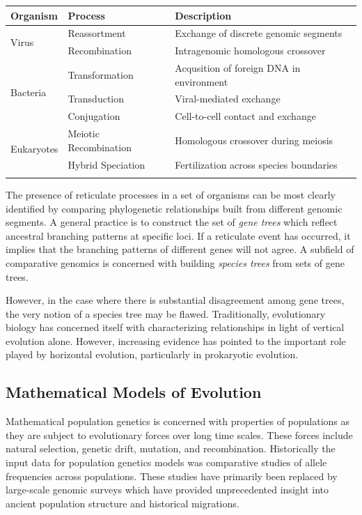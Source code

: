 \begin{tabularx}{\textwidth}{lll}
\toprule
Organism & Process & Description \\
\midrule
\multirow{2}{*}{Virus} & Reassortment & Exchange of discrete genomic segments \\
                       & Recombination & Intragenomic homologous crossover \\
\midrule
\multirow{3}{*}{Bacteria} & Transformation & Acqusition of foreign DNA in environment \\
                          & Transduction   & Viral-mediated exchange \\
                          & Conjugation    & Cell-to-cell contact and exchange \\
\midrule
\multirow{2}{*}{Eukaryotes} & Meiotic Recombination & Homologous crossover during meiosis \\
                            & Hybrid Speciation         & Fertilization across species boundaries \\
\bottomrule
\label{table:reticulation_processes}
\end{tabularx}

The presence of reticulate processes in a set of organisms can be most clearly identified by comparing phylogenetic relationships built from different genomic segments.
A general practice is to construct the set of \emph{gene trees} which reflect ancestral branching patterns at specific loci.
If a reticulate event has occurred, it implies that the branching patterns of different genes will not agree.
A subfield of comparative genomics is concerned with building \emph{species trees} from sets of gene trees.

However, in the case where there is substantial disagreement among gene trees, the very notion of a species tree may be flawed.
Traditionally, evolutionary biology has concerned itself with characterizing relationships in light of vertical evolution alone.
However, increasing evidence  has pointed to the important role played by horizontal evolution, particularly in prokaryotic evolution.

\subsection{Mathematical Models of Evolution}

Mathematical population genetics is concerned with properties of populations as they are subject to evolutionary forces over long time scales.
These forces include natural selection, genetic drift, mutation, and recombination.
Historically the input data for population genetics models was comparative studies of allele frequencies across populations.
These studies have primarily been replaced by large-scale genomic surveys which have provided unprecedented insight into ancient population structure and historical migrations.


